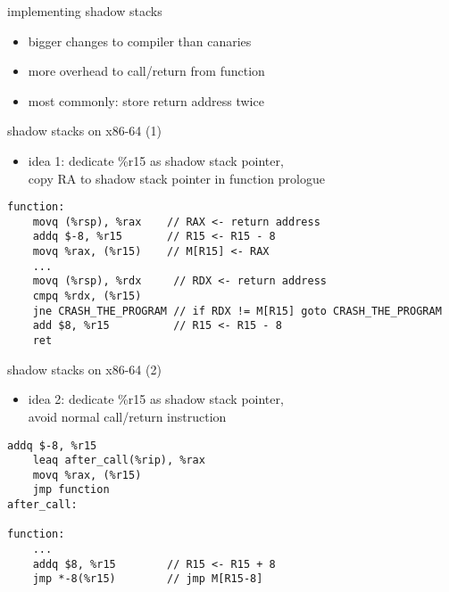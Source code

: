 \begin{frame}{implementing shadow stacks}
    \begin{itemize}
    \item bigger changes to compiler than canaries
    \item more overhead to call/return from function
    \item most commonly: store return address twice
    \end{itemize}
\end{frame}

\begin{frame}[fragile,label=shadowStackx8664v1]{shadow stacks on x86-64 (1)}
\begin{itemize}
\item idea 1: dedicate \%r15 as shadow stack pointer, \\
      copy RA to shadow stack pointer in function prologue
\end{itemize}
\begin{lstlisting}[language=myasm]
function:
    movq (%rsp), %rax    // RAX <- return address
    addq $-8, %r15       // R15 <- R15 - 8
    movq %rax, (%r15)    // M[R15] <- RAX
    ...
    movq (%rsp), %rdx     // RDX <- return address
    cmpq %rdx, (%r15)    
    jne CRASH_THE_PROGRAM // if RDX != M[R15] goto CRASH_THE_PROGRAM
    add $8, %r15          // R15 <- R15 - 8
    ret
\end{lstlisting}
\end{frame}

\begin{frame}[fragile,label=shadowStackx8664v2]{shadow stacks on x86-64 (2)}
\begin{itemize}
\item idea 2: dedicate \%r15 as shadow stack pointer, \\
      avoid normal call/return instruction
\end{itemize}
\begin{lstlisting}[language=myasm]
    addq $-8, %r15
    leaq after_call(%rip), %rax
    movq %rax, (%r15)
    jmp function
after_call:

function:
    ...
    addq $8, %r15        // R15 <- R15 + 8
    jmp *-8(%r15)        // jmp M[R15-8]
\end{lstlisting}
\end{frame}

